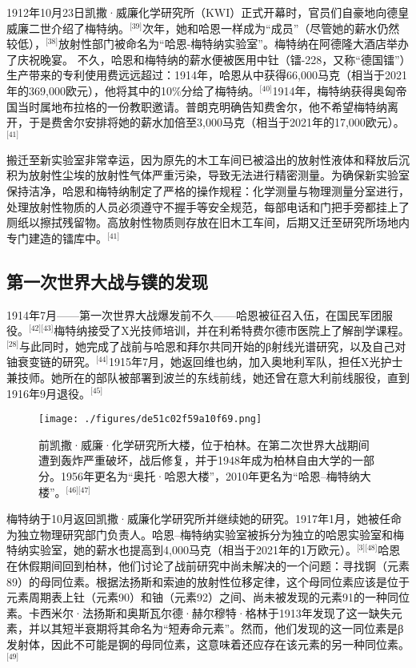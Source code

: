 1912年10月23日凯撒·威廉化学研究所（KWI）正式开幕时，官员们自豪地向德皇威廉二世介绍了梅特纳。\(^\text{[39]}\)次年，她和哈恩一样成为“成员”（尽管她的薪水仍然较低），\(^\text{[38]}\)放射性部门被命名为“哈恩-梅特纳实验室”。梅特纳在阿德隆大酒店举办了庆祝晚宴。
不久，哈恩和梅特纳的薪水便被医用中钍（镭-228，又称“德国镭”）生产带来的专利使用费远远超过：1914年，哈恩从中获得66,000马克（相当于2021年的369,000欧元），他将其中的10\%分给了梅特纳。\(^\text{[40]}\)1914年，梅特纳获得奥匈帝国当时属地布拉格的一份教职邀请。普朗克明确告知费舍尔，他不希望梅特纳离开，于是费舍尔安排将她的薪水加倍至3,000马克（相当于2021年的17,000欧元）。\(^\text{[41]}\)

搬迁至新实验室非常幸运，因为原先的木工车间已被溢出的放射性液体和释放后沉积为放射性尘埃的放射性气体严重污染，导致无法进行精密测量。为确保新实验室保持洁净，哈恩和梅特纳制定了严格的操作规程：化学测量与物理测量分室进行，处理放射性物质的人员必须遵守不握手等安全规范，每部电话和门把手旁都挂上了厕纸以擦拭残留物。高放射性物质则存放在旧木工车间，后期又迁至研究所场地内专门建造的镭库中。\(^\text{[41]}\)
\subsection{第一次世界大战与镤的发现}
1914年7月——第一次世界大战爆发前不久——哈恩被征召入伍，在国民军团服役。\(^\text{[42][43]}\)梅特纳接受了X光技师培训，并在利希特费尔德市医院上了解剖学课程。\(^\text{[28]}\)与此同时，她完成了战前与哈恩和拜尔共同开始的β射线光谱研究，以及自己对铀衰变链的研究。\(^\text{[44]}\)1915年7月，她返回维也纳，加入奥地利军队，担任X光护士兼技师。她所在的部队被部署到波兰的东线前线，她还曾在意大利前线服役，直到1916年9月退役。\(^\text{[45]}\)
\begin{figure}[ht]
\centering
\texttt{[image: ./figures/de51c02f59a10f69.png]}
\caption{前凯撒·威廉·化学研究所大楼，位于柏林。在第二次世界大战期间遭到轰炸严重破坏，战后修复，并于1948年成为柏林自由大学的一部分。1956年更名为“奥托·哈恩大楼”，2010年更名为“哈恩–梅特纳大楼”。\(^\text{[46][47]}\)} \label{fig_LZm_6}
\end{figure}
梅特纳于10月返回凯撒·威廉化学研究所并继续她的研究。1917年1月，她被任命为独立物理研究部门负责人。哈恩–梅特纳实验室被拆分为独立的哈恩实验室和梅特纳实验室，她的薪水也提高到4,000马克（相当于2021年的1万欧元）。\(^\text{[3][48]}\)哈恩在休假期间回到柏林，他们讨论了战前研究中尚未解决的一个问题：寻找锕（元素89）的母同位素。根据法扬斯和索迪的放射性位移定律，这个母同位素应该是位于元素周期表上钍（元素90）和铀（元素92）之间、尚未被发现的元素91的一种同位素。卡西米尔·法扬斯和奥斯瓦尔德·赫尔穆特·格林于1913年发现了这一缺失元素，并以其短半衰期将其命名为“短寿命元素”。然而，他们发现的这一同位素是β发射体，因此不可能是锕的母同位素，这意味着还应存在该元素的另一种同位素。\(^\text{[49]}\)

